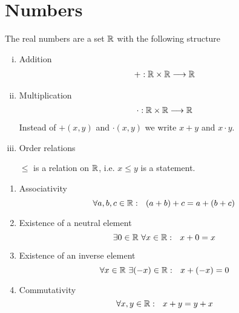 \documentclass[../../script.tex]{subfiles}
\begin{document}
\section{Numbers}
\begin{defi}
The real numbers are a set $\mathbb{R}$ with the following structure
\begin{enumerate}[(i)]
	\item Addition
	\begin{align*}
		+: \mathbb{R} \times \mathbb{R} \longrightarrow \mathbb{R}
	\end{align*}
	\item Multiplication
	\begin{align*}
		\cdot: \mathbb{R} \times \mathbb{R} \longrightarrow \mathbb{R}
	\end{align*}
	Instead of $+(x, y)$ and $\cdot(x, y)$ we write $x+y$ and $x \cdot y$.
	\item Order relations
	
	$\le$ is a relation on $\mathbb{R}$, i.e. $x \le y$ is a statement.
\end{enumerate}
\end{defi}

\begin{defi}\leavevmode
\begin{enumerate}[label=A\arabic*:]
	\item Associativity
	\[
		\forall a, b, c \in \mathbb{R}: ~~(a + b) + c = a + (b + c)
	\]
	\item Existence of a neutral element
	\[
		\exists 0 \in \mathbb{R} ~\forall x \in \mathbb{R}: ~~x + 0 = x
	\]
	\item Existence of an inverse element
	\[
		\forall x \in \mathbb{R} ~\exists (-x) \in \mathbb{R}: ~~ x + (-x) = 0
	\]
	\item Commutativity
	\[
		\forall x, y \in \mathbb{R}: ~~x + y = y + x
	\]
\end{enumerate}
\end{defi}
\end{document}
